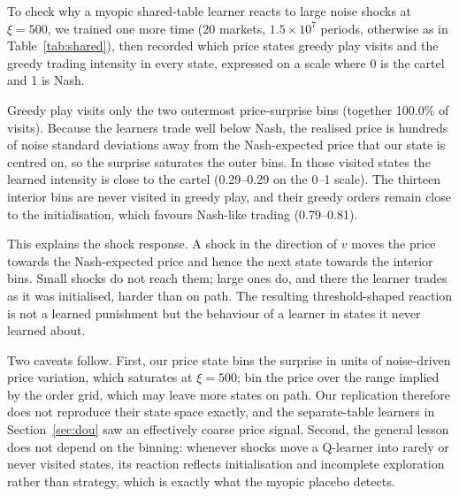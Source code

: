 To check why a myopic shared-table learner reacts to large noise shocks at
$\xi=500$, we trained one more time (20 markets, $1.5\times10^7$ periods,
otherwise as in Table~\ref{tab:shared}), then recorded which price states greedy
play visits and the greedy trading intensity in every state, expressed on a
scale where 0 is the cartel and 1 is Nash.

Greedy play visits only the two outermost price-surprise bins
(together 100.0\% of visits). Because the learners trade well below
Nash, the realised price is hundreds of noise standard deviations away from the
Nash-expected price that our state is centred on, so the surprise saturates
the outer bins. In those visited states the learned intensity is close to the
cartel (0.29--0.29 on the 0--1 scale). The thirteen interior
bins are never visited in greedy play, and their greedy orders remain close to
the initialisation, which favours Nash-like trading (0.79--0.81).

This explains the shock response. A shock in the direction of $v$ moves the
price towards the Nash-expected price and hence the next state towards the
interior bins. Small shocks do not reach them; large ones do, and there the
learner trades as it was initialised, harder than on path. The resulting
threshold-shaped reaction is not a learned punishment but the behaviour of a
learner in states it never learned about.

Two caveats follow. First, our price state bins the surprise in units of
noise-driven price variation, which saturates at $\xi=500$; \citet{dou2025}
bin the price over the range implied by the order grid, which may leave more
states on path. Our replication therefore does not reproduce their state
space exactly, and the separate-table learners in Section~\ref{sec:dou} saw
an effectively coarse price signal. Second, the general lesson does not depend
on the binning: whenever shocks move a Q-learner into rarely or never visited
states, its reaction reflects initialisation and incomplete exploration rather
than strategy, which is exactly what the myopic placebo detects.

